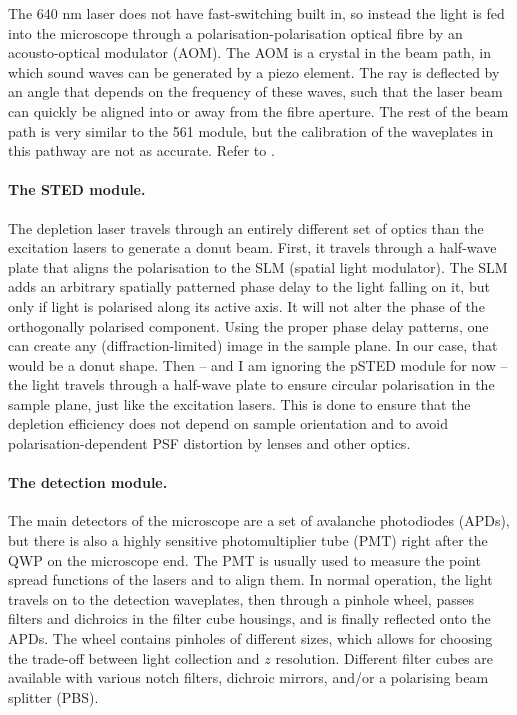The 640 nm laser does not have fast-switching built in, so instead the light is fed into the microscope through a polarisation-polarisation optical fibre by an acousto-optical modulator (AOM). The AOM is a crystal in the beam path, in which sound waves can be generated by a piezo element. The ray is deflected by an angle that depends on the frequency of these waves, such that the laser beam can quickly be aligned into or away from the fibre aperture. The rest of the beam path is very similar to the 561 module, but the calibration of the waveplates in this pathway are not as accurate. Refer to .

\paragraph{The STED module.} The depletion laser travels through an entirely different set of optics than the excitation lasers to generate a donut beam. First, it travels through a half-wave plate that aligns the polarisation to the SLM (spatial light modulator). The SLM adds an arbitrary spatially patterned phase delay to the light falling on it, but only if light is polarised along its active axis. It will not alter the phase of the orthogonally polarised component. Using the proper phase delay patterns, one can create any (diffraction-limited) image in the sample plane. In our case, that would be a donut shape. Then -- and I am ignoring the pSTED module for now -- the light travels through a half-wave plate to ensure circular polarisation in the sample plane, just like the excitation lasers. This is done to ensure that the depletion efficiency does not depend on sample orientation and to avoid polarisation-dependent PSF distortion by lenses and other optics. 

\paragraph{The detection module.} The main detectors of the microscope are a set of avalanche photodiodes (APDs), but there is also a highly sensitive photomultiplier tube (PMT) right after the QWP on the microscope end. The PMT is usually used to measure the point spread functions of the lasers and to align them. In normal operation, the light travels on to the detection waveplates, then through a pinhole wheel, passes filters and dichroics in the filter cube housings, and is finally reflected onto the APDs. The wheel contains pinholes of different sizes, which allows for choosing the trade-off between light collection and $ z $ resolution. Different filter cubes are available with various notch filters, dichroic mirrors, and/or a polarising beam splitter (PBS).

